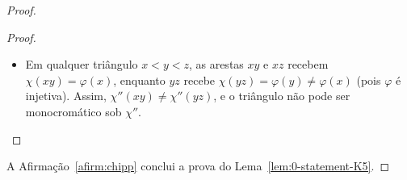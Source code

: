 \documentclass[reqno, 12pt]{amsart}
\numberwithin{equation}{section}
\theoremstyle{plain}
\theoremstyle{definition}
\begin{document}
\begin{proof}
\begin{proof}
\begin{itemize}
  \item Em qualquer triângulo $x < y < z$, as arestas $xy$ e $xz$ recebem $\chi(xy) =
  \varphi(x)$, enquanto $yz$ recebe $\chi(yz) = \varphi(y) \ne \varphi(x)$ (pois $\varphi$
  é injetiva). Assim, $\chi''(xy) \ne \chi''(yz)$, e o triângulo não pode ser
  monocromático sob $\chi''$.
\end{itemize}
\end{proof}

\noindent
A Afirmação~\ref{afirm:chipp} conclui a prova do Lema~\ref{lem:0-statement-K5}.

\end{proof}

\end{document}
